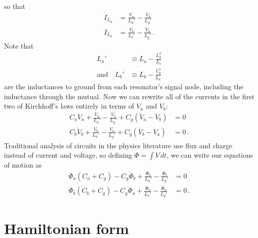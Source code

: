 \documentclass{article}
\begin{document}
so that
\begin{align*}
  \dot I_{L_a} &= \frac{V_a}{L_a'} - \frac{V_b}{L_g'} \\
  \dot I_{L_b} &= \frac{V_b}{L_b'} - \frac{V_a}{L_g'} \, .
\end{align*}
Note that
\begin{align*}
  L_a' & \equiv L_a - \frac{L_g^2}{L_b} \\
  \text{and} \quad
  L_b' & \equiv L_b - \frac{L_g^2}{L_a}
\end{align*}
are the inductances to ground from each resonator's signal node, including the inductance through the mutual.
Now we can rewrite all of the currents in the first two of Kirchhoff's laws entirely in terms of $V_a$ and $V_b$:
\begin{align*}
  C_a \ddot V_a + \frac{V_a}{L_a'} - \frac{V_b}{L_g'} + C_g (\ddot V_a - \ddot V_b) &= 0 \\
  C_b \ddot V_b + \frac{V_b}{L_b'} - \frac{V_a}{L_g'} + C_g (\ddot V_b - \ddot V_a) &= 0 \, .
\end{align*}
Traditional analysis of circuits in the physics literature use flux and charge instead of current and voltage, so defining $\Phi = \int V \, dt$, we can write our equations of motion as
\begin{align*}
  \ddot \Phi_a (C_a + C_g) - C_g \ddot \Phi_b + \frac{\Phi_a}{L_a'} - \frac{\Phi_b}{L_g'} &= 0 \\
  \ddot \Phi_b (C_b + C_g) - C_g \ddot \Phi_a + \frac{\Phi_b}{L_b'} - \frac{\Phi_a}{L_g'} &= 0 \, .
\end{align*}

\section{Hamiltonian form}
\end{document}
